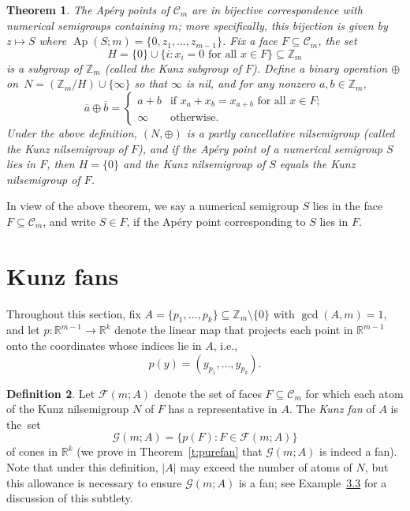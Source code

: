 \documentclass[10pt,a4paper]{amsart}
\newcommand\ZZ{\mathbb{Z}}
\newcommand\RR{\mathbb{R}}
\newcommand\cC{{\mathcal C}}
\DeclareMathOperator\Ap{Ap}
\newtheorem{thm}{Theorem}[section]
\theoremstyle{definition}\newtheorem{defi}[thm]{Definition}
\begin{document}
\begin{thm}\label{t:kunznilsemigroupface}
The Ap\'ery points of $\cC_m$ are in bijective correspondence with numerical semigroups containing $m$; more specifically, this bijection is given by $z \mapsto S$ where $\Ap(S;m) = \{0, z_1,\ldots, z_{m-1}\}$.  
Fix a face $F \subseteq \cC_m$, the set
$$H = \{0\} \cup \{i : x_i = 0 \text{ for all } x \in F\} \subseteq \ZZ_m$$
is a subgroup of $\ZZ_m$ (called the \emph{Kunz subgroup} of $F$).  Define a binary operation $\oplus$ on~$N = (\ZZ_m/H) \cup \{\infty\}$ so that $\infty$ is nil, and for any nonzero $a,b \in \ZZ_m$,
\[
\overline a \oplus \overline b = \begin{cases}
a+b & \text{if } x_a + x_b = x_{a+b} \text{ for all } x \in F; \\
\infty & \text{otherwise.}
\end{cases}
\]
Under the above definition, $(N, \oplus)$ is a partly cancellative nilsemigroup (called the \emph{Kunz nilsemigroup} of $F$), and if the Ap\'ery point of a numerical semigroup $S$ lies in $F$, then $H = \{0\}$ and the Kunz nilsemigroup of $S$ equals the Kunz nilsemigroup of $F$.  
\end{thm}

In view of the above theorem, we say a numerical semigroup $S$ lies in the face $F \subseteq \cC_m$, and write $S \in F$, if the Ap\'ery point corresponding to $S$ lies in $F$.  



\section{Kunz fans}
\label{sec:kunzfan}

Throughout this section, fix $A = \{p_1, \ldots, p_k\} \subseteq \ZZ_m \setminus \{0\}$ with $\gcd(A, m) = 1$, and let $p:\RR^{m-1} \to \RR^k$ denote the linear map that projects each point in $\RR^{m-1}$ onto the coordinates whose indices lie in $A$, i.e., 
$$p(y) = (y_{p_1}, \ldots, y_{p_k}).$$

\begin{defi}\label{d:kunzfan}
Let $\mathcal F(m;A)$ denote the set of faces $F \subseteq \cC_m$ for which each atom of the Kunz nilsemigroup $N$ of $F$ has a representative in $A$.  
The \emph{Kunz fan} of $A$ is the~set
$$
\mathcal G(m;A) = \{p(F) : F \in \mathcal F(m;A)\}
$$
of cones in $\RR^k$ (we prove in Theorem~\ref{t:purefan} that $\mathcal G(m;A)$ is indeed a fan).  Note that under this definition, $|A|$ may exceed the number of atoms of $N$, but this allowance is necessary to ensure $\mathcal G(m;A)$ is a fan; see Example~\href{https://alco.centre-mersenne.org/articles/10.5802/alco.425/}{3.3} for a discussion of this subtlety.  
\end{defi}
\end{document}
